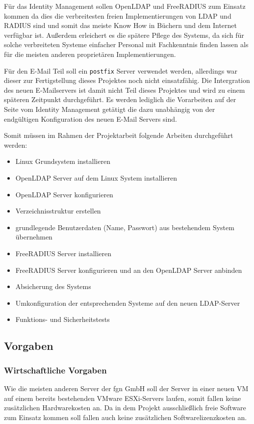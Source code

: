 \documentclass[11pt,a4paper,titlepage=firstiscover,headsepline]{scrartcl} %
\begin{document}
Für das Identity Management sollen OpenLDAP und FreeRADIUS zum Einsatz kommen da dies die verbreitesten freien Implementierungen von LDAP und RADIUS sind und somit das meiste Know How in Büchern und dem Internet verfügbar ist. Außerdem erleichert es die spätere Pflege des Systems, da sich für solche verbreiteten Systeme einfacher Personal mit Fachkenntnis finden lassen als für die meisten anderen proprietären Implementierungen.

Für den E-Mail Teil soll ein \texttt{postfix} Server verwendet werden, allerdings war dieser zur Fertigstellung dieses Projektes noch nicht einsatzfähig. Die Intergration des neuen E-Mailservers ist damit nicht Teil dieses Projektes und wird zu einem späteren Zeitpunkt durchgeführt. Es werden lediglich die Vorarbeiten auf der Seite vom Identity Management getätigt die dazu unabhängig von der endgültigen Konfiguration des neuen E-Mail Servers sind.

\medskip \noindent 		%
Somit müssen im Rahmen der Projektarbeit folgende Arbeiten durchgeführt werden: 
\begin{itemize}
\item Linux Grundsystem installieren
\item OpenLDAP Server auf dem Linux System installieren
\item OpenLDAP Server konfigurieren
\item Verzeichnisstruktur erstellen
\item grundlegende Benutzerdaten (Name, Passwort) aus bestehendem System übernehmen
\item FreeRADIUS Server installieren
\item FreeRADIUS Server konfigurieren und an den OpenLDAP Server anbinden
\item Absicherung des Systems
\item Umkonfiguration der entsprechenden Systeme auf den neuen LDAP-Server
\item Funktions- und Sicherheitstests
\end{itemize}


\subsection{Vorgaben}
\subsubsection{Wirtschaftliche Vorgaben}
Wie die meisten anderen Server der fgn GmbH soll der Server in einer neuen VM auf einem bereits bestehenden VMware ESXi-Servers laufen, somit fallen keine zusätzlichen Hardwarekosten an. Da in dem Projekt  ausschließlich freie Software zum Einsatz kommen soll fallen auch keine zusätzlichen Softwarelizenzkosten an.
\end{document}

